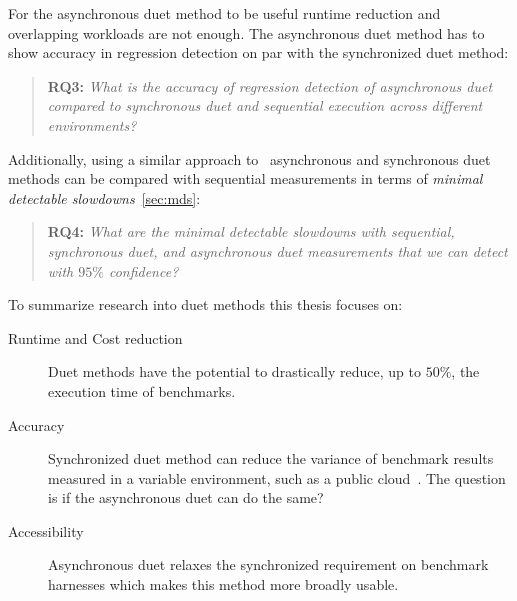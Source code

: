 
For the asynchronous duet method to be useful runtime reduction and overlapping workloads are not enough.
The asynchronous duet method has to show accuracy in regression detection on par with the synchronized duet method:

\begin{quote}
	\textbf{RQ3:} \emph{What is the accuracy of regression detection of asynchronous duet compared to synchronous duet and sequential execution across different environments?}
\end{quote}

Additionally, using a similar approach to~\citet{laaber2019software} asynchronous and synchronous duet methods can be compared with sequential measurements in terms of \emph{minimal detectable slowdowns}~\cref{sec:mds}:

\begin{quote}
	\textbf{RQ4:} \emph{What are the minimal detectable slowdowns with sequential, synchronous duet, and asynchronous duet measurements that we can detect with $95\%$ confidence?}
\end{quote}

To summarize research into duet methods this thesis focuses on:
\begin{description}
	\item[Runtime and Cost reduction] Duet methods have the potential to drastically reduce, up to $50\%$, the execution time of benchmarks.
	\item[Accuracy] Synchronized duet method can reduce the variance of benchmark results measured in a variable environment, such as a public cloud~\citet{bulej2020duet}. The question is if the asynchronous duet can do the same?
	\item[Accessibility] Asynchronous duet relaxes the synchronized requirement on benchmark harnesses which makes this method more broadly usable.
\end{description}
